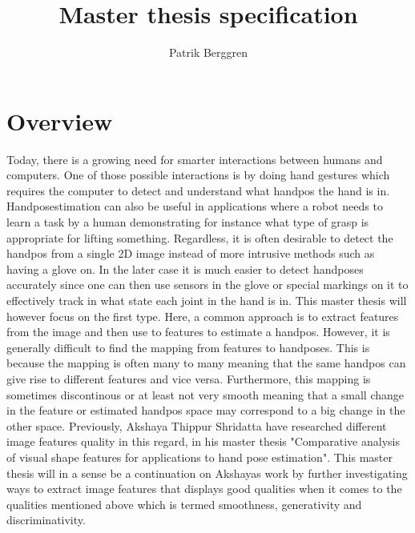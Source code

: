 \documentclass[12pt]{article}
\begin{document}
\newcommand{\B}{\cellcolor{blue!25}}
\newcommand{\BB}{\cellcolor{blue!100}}
\newcommand{\R}{\cellcolor{red!25}}
\newcommand{\RR}{\cellcolor{red!100}}

\title{Master thesis specification}
\author{Patrik Berggren}
\maketitle
\section*{Overview}
Today, there is a growing need for smarter interactions between humans and computers.
One of those possible interactions is by doing hand gestures which requires the computer to detect and understand what handpos the hand is in.
Handposestimation can also be useful in applications where a robot needs to learn a task by a human demonstrating for instance what type of grasp is appropriate for lifting something.
Regardless, it is often desirable to detect the handpos from a single 2D image instead of more intrusive methods such as having a glove on.
In the later case it is much easier to detect handposes accurately since one can then use sensors in the glove or special markings on it to effectively track in what state each joint in the hand is in.
This master thesis will however focus on the first type.
Here, a common approach is to extract features from the image and then use to features to estimate a handpos.
However, it is generally difficult to find the mapping from features to handposes.
This is because the mapping is often many to many meaning that the same handpos can give rise to different features and vice versa.
Furthermore, this mapping is sometimes discontinous or at least not very smooth meaning that a small change in the feature or estimated handpos space may correspond to a big change in the other space.
Previously, Akshaya Thippur Shridatta have researched different image features quality in this regard, in his master thesis "Comparative analysis of visual shape features for applications to hand pose estimation".
This master thesis will in a sense be a continuation on Akshayas work by further investigating ways to extract image features that displays good qualities when it comes to the qualities mentioned above which is termed smoothness, generativity and discriminativity.
\end{document}
